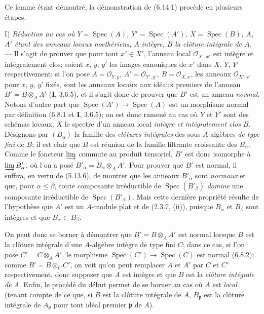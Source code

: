 Ce lemme étant démontré, la démonstration de (6.14.1) procède en plusieurs
étapes.

I) \emph{Réduction au cas où $Y=\operatorname{Spec}(A)$,
$Y'=\operatorname{Spec}(A')$, $X=\operatorname{Spec}(B)$, $A$, $A'$ étant
des anneaux locaux noethériens, $A$ intègre, $B$ la clôture intégrale de
$A$.} --- Il s'agit de prouver que pour tout $x'\in X'$, l'anneau local
$\mathcal O_{X',x'}$ est intègre et intégralement clos; soient $x$, $y$,
$y'$ les images canoniques de $x'$ dans $X$, $Y$, $Y'$ respectivement; si
l'on pose $A=\mathcal O_{Y,y}$, $A'=\mathcal O_{Y',y'}$,
$B=\mathcal O_{X,x}$, les anneaux $\mathcal O_{X',x'}$ pour $x$, $y$, $y'$
fixés, sont les anneaux locaux aux idéaux premiers de l'anneau
$B'=B\otimes_A A'$ (\textbf{I}, 3.6.5), et il s'agit donc de prouver que $B'$ est un
anneau \emph{normal}. Notons d'autre part que
$\operatorname{Spec}(A')\to\operatorname{Spec}(A)$ est un morphisme normal
par définition (6.8.1 et \textbf{I}, 3.6.5); on est donc ramené au cas où $Y$ et $Y'$
sont des schémas locaux, $X$ le spectre d'un anneau local \emph{intègre et
intégralement clos} $B$. Désignons par $(B_\alpha)$ la famille des \emph{clôtures
intégrales} des sous-$A$-algèbres \emph{de type fini} de $B$; il est clair que $B$
est réunion de la famille filtrante croissante des $B_\alpha$. Comme le
foncteur $\varinjlim$ commute au produit tensoriel, $B'$ est donc isomorphe
à $\varinjlim B'_\alpha$, où l'on a posé
$B'_\alpha=B_\alpha\otimes_A A'$. Pour prouver que $B'$ est normal, il
suffira, en vertu de (5.13.6), de montrer que les anneaux $B'_\alpha$ sont
\emph{normaux} et que, pour $\alpha\leqslant\beta$, toute composante irréductible
de $\operatorname{Spec}(B'_\beta)$ \emph{domine} une composante irréductible de
$\operatorname{Spec}(B'_\alpha)$. Mais cette dernière propriété résulte de
l'hypothèse que $A'$ est un $A$-module plat et de (2.3.7, (ii)), puisque
$B_\alpha$ et $B_\beta$ sont intègres et que $B_\alpha\subset B_\beta$.

On peut donc se borner à démontrer que $B'=B\otimes_A A'$ est normal lorsque
$B$ est
la clôture intégrale d'une $A$-algèbre intègre de type fini $C$;
dans ce cas, si l'on pose $C'=C\otimes_A A'$, le morphisme
$\operatorname{Spec}(C')\to\operatorname{Spec}(C)$ est normal (6.8.2);
comme $B'=B\otimes_C C'$, on voit qu'on peut remplacer $A$ et $A'$ par $C$
et $C'$ respectivement, donc supposer que $A$ est intègre et que $B$ est la
\emph{clôture intégrale de} $A$. Enfin, le procédé du début permet de se borner au
cas où $A$ est \emph{local} (tenant compte de ce que, si $B$ est la clôture
intégrale de $A$, $B_\mathfrak p$ est la clôture intégrale de
$A_\mathfrak p$ pour tout idéal premier $\mathfrak p$ de $A$).

